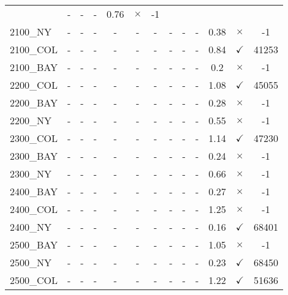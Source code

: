 \documentclass[main.tex]{subfiles}
\begin{document}
\begin{landscape}
\begin{center}
\begin{tabular}{lcccccccccccc}
 & - & - & - 
 & 0.76 & $\times$ & -1\\
2100\_NY & - & - & - 
 & - & - & - 
 & - & - & - 
 & 0.38 & $\times$ & -1\\
2100\_COL & - & - & - 
 & - & - & - 
 & - & - & - 
 & 0.84 & $\checkmark$ & 41253\\
2100\_BAY & - & - & - 
 & - & - & - 
 & - & - & - 
 & 0.2 & $\times$ & -1\\
2200\_COL & - & - & - 
 & - & - & - 
 & - & - & - 
 & 1.08 & $\checkmark$ & 45055\\
2200\_BAY & - & - & - 
 & - & - & - 
 & - & - & - 
 & 0.28 & $\times$ & -1\\
2200\_NY & - & - & - 
 & - & - & - 
 & - & - & - 
 & 0.55 & $\times$ & -1\\
2300\_COL & - & - & - 
 & - & - & - 
 & - & - & - 
 & 1.14 & $\checkmark$ & 47230\\
2300\_BAY & - & - & - 
 & - & - & - 
 & - & - & - 
 & 0.24 & $\times$ & -1\\
2300\_NY & - & - & - 
 & - & - & - 
 & - & - & - 
 & 0.66 & $\times$ & -1\\
2400\_BAY & - & - & - 
 & - & - & - 
 & - & - & - 
 & 0.27 & $\times$ & -1\\
2400\_COL & - & - & - 
 & - & - & - 
 & - & - & - 
 & 1.25 & $\times$ & -1\\
2400\_NY & - & - & - 
 & - & - & - 
 & - & - & - 
 & 0.16 & $\checkmark$ & 68401\\
2500\_BAY & - & - & - 
 & - & - & - 
 & - & - & - 
 & 1.05 & $\times$ & -1\\
2500\_NY & - & - & - 
 & - & - & - 
 & - & - & - 
 & 0.23 & $\checkmark$ & 68450\\
2500\_COL & - & - & - 
 & - & - & - 
 & - & - & - 
 & 1.22 & $\checkmark$ & 51636\\
\hline\end{tabular}
\end{center}
\end{landscape}
\end{document}
